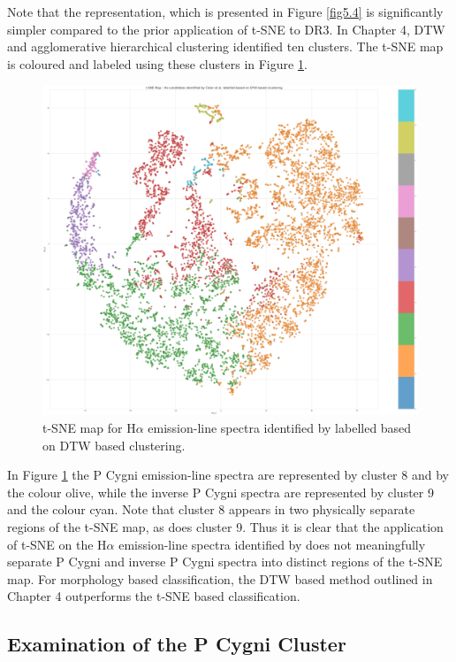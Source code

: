 Note that the representation, which is presented in Figure \ref{fig5.4} is significantly simpler compared to the prior application of t-SNE to DR3. In Chapter 4, DTW and agglomerative hierarchical clustering identified ten clusters. The t-SNE map is coloured and labeled using these clusters in Figure \ref{fig5.5}.

\begin{figure}[!htb]
\centering
\includegraphics[scale=0.16]{figures/t-sne colored by dtw.png}
\caption{t-SNE map for H$\alpha$ emission-line spectra identified by \citet{vcotar2021galah} labelled based on DTW based clustering.}
\label{fig5.5}
\end{figure}

In Figure \ref{fig5.5} the P Cygni emission-line spectra are represented by cluster 8 and by the colour olive, while the inverse P Cygni spectra are represented by cluster 9 and the colour cyan. Note that cluster 8 appears in two physically separate regions of the t-SNE map, as does cluster 9. Thus it is clear that the application of t-SNE on the H$\alpha$ emission-line spectra identified by \citet{vcotar2021galah} does not meaningfully separate P Cygni and inverse P Cygni spectra into distinct regions of the t-SNE map. For morphology based classification, the DTW based method outlined in Chapter 4 outperforms the t-SNE based classification.

\subsection{Examination of the P Cygni Cluster}


